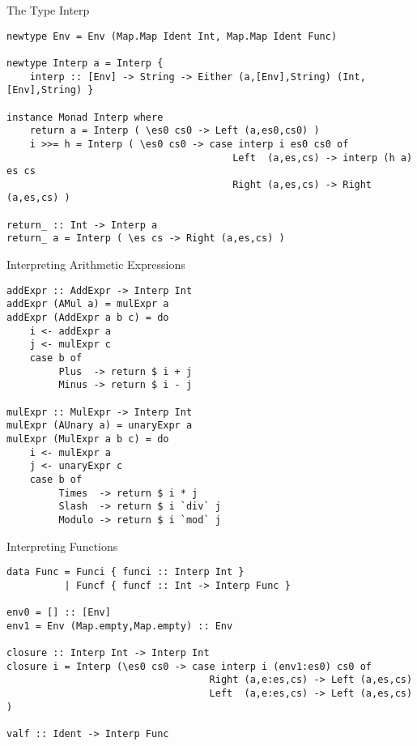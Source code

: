 \documentclass[12pt]{beamer}
\newcommand{\codesize}{\fontsize{7.7}{7.7}}
\begin{document}
\begin{spacing}{1.3}
\begin{frame}[fragile=singleslide]{The Type Interp}
\begin{verbatim}
newtype Env = Env (Map.Map Ident Int, Map.Map Ident Func)

newtype Interp a = Interp {
    interp :: [Env] -> String -> Either (a,[Env],String) (Int,[Env],String) }

instance Monad Interp where
    return a = Interp ( \es0 cs0 -> Left (a,es0,cs0) )
    i >>= h = Interp ( \es0 cs0 -> case interp i es0 cs0 of
                                       Left  (a,es,cs) -> interp (h a) es cs
                                       Right (a,es,cs) -> Right  (a,es,cs) )
                                       
return_ :: Int -> Interp a
return_ a = Interp ( \es cs -> Right (a,es,cs) )
\end{verbatim}
\end{frame}

\begin{frame}[fragile=singleslide]{Interpreting Arithmetic Expressions}
\begin{verbatim}
addExpr :: AddExpr -> Interp Int
addExpr (AMul a) = mulExpr a
addExpr (AddExpr a b c) = do
    i <- addExpr a
    j <- mulExpr c
    case b of
         Plus  -> return $ i + j
         Minus -> return $ i - j

mulExpr :: MulExpr -> Interp Int
mulExpr (AUnary a) = unaryExpr a
mulExpr (MulExpr a b c) = do
    i <- mulExpr a
    j <- unaryExpr c
    case b of
         Times  -> return $ i * j
         Slash  -> return $ i `div` j
         Modulo -> return $ i `mod` j
\end{verbatim}
\end{frame}

\begin{frame}[fragile=singleslide]{Interpreting Functions}
\begin{verbatim}
data Func = Funci { funci :: Interp Int }
          | Funcf { funcf :: Int -> Interp Func }

env0 = [] :: [Env]
env1 = Env (Map.empty,Map.empty) :: Env

closure :: Interp Int -> Interp Int
closure i = Interp (\es0 cs0 -> case interp i (env1:es0) cs0 of
                                   Right (a,e:es,cs) -> Left (a,es,cs)
                                   Left  (a,e:es,cs) -> Left (a,es,cs) )
                  
valf :: Ident -> Interp Func


\end{verbatim}
\end{frame}
\end{spacing}
\end{document}
